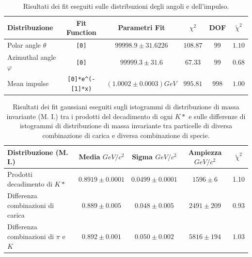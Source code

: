 \documentclass{article}
\begin{document}
\begin{table}[ht]
\centering
\begin{tabular}{|l|c|c|c|c|c|}
\hline
Distribuzione & Fit Function & Parametri Fit & \({\chi}^2\) & DOF & \(\tilde{\chi}^2\) \\
\hline %
Polar angle \(\theta\) & \verb|[0]| & \(99998.9 \pm 31.6226\) & \(108.87\) & \(99\) & \(1.10\) \\
Azimuthal angle \(\varphi\) & \verb|[0]| & \(99999.3 \pm 31.6\) & \(67.33\) & \(99\) & \(0.68\) \\
Mean impulse & \verb|[0]*e^(-[1]*x)| & \((1.0002 \pm 0.0003) GeV\) & \(995.81\) & \(998\) & \(1.00\) \\
\hline
\end{tabular}
\caption{Risultati dei fit eseguiti sulle distribuzioni degli angoli e dell'impulso.}
\end{table}
\begin{table}[H]
\centering
\begin{tabular}{|l|c|c|c|c|}
\hline
Distribuzione (M. I.) & Media \(GeV/c^2\) & Sigma \(GeV/c^2\) & Ampiezza \(GeV/c^2\) & \(\tilde{\chi}^2\) \\
\hline
Prodotti decadimento  di \(K*\) & \(0.8919 \pm 0.0001\) & \(0.0499 \pm 0.0001\) & \(1596 \pm 6\) & 1.10\\
Differenza combinazioni di carica & \(0.889 \pm 0.005\) & \(0.048 \pm 0.005\) & \(2491 \pm 209\) & \(0.93\)\\
Differenza combinazioni di \(\pi\) e \(K\) & \(0.892 \pm 0.001\) & \(0.050 \pm 0.002\) & \(5816 \pm 194\) & \(1.03\)\\
\hline
\end{tabular}
\caption{Risultati dei fit gaussiani eseguiti sugli istogrammi 
 di distribuzione di massa invariante (M. I.) tra i prodotti del decadimento di ogni \(K*\) e sulle differenze di istogrammi di distribuzione di massa invariante tra particelle di diversa combinazione di carica e diversa combinazione di specie.}
\end{table}
\end{document}
